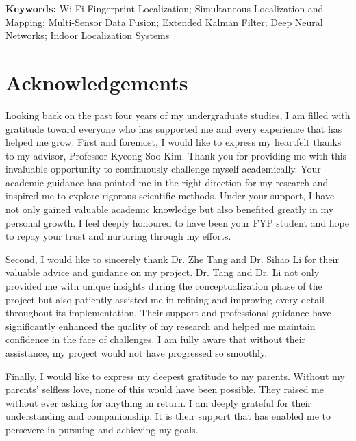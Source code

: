 \documentclass[12pt,a4paper]{article}
\numberwithin{equation}{section}
\begin{document}
\vspace{0.5cm}%
\noindent%
\textbf{Keywords:} Wi-Fi Fingerprint Localization; Simultaneous Localization and
Mapping; Multi-Sensor Data Fusion; Extended Kalman Filter; Deep Neural Networks;
Indoor Localization Systems



\newpage
\section*{Acknowledgements}
 Looking back on the past four
years of my undergraduate studies, I am filled with gratitude toward everyone
who has supported me and every experience that has helped me grow. First and
foremost, I would like to express my heartfelt thanks to my advisor, Professor
Kyeong Soo Kim. Thank you for providing me with this invaluable opportunity to
continuously challenge myself academically. Your academic guidance has pointed
me in the right direction for my research and inspired me to explore rigorous
scientific methods. Under your support, I have not only gained valuable academic
knowledge but also benefited greatly in my personal growth. I feel deeply
honoured to have been your FYP student and hope to repay your trust and
nurturing through my efforts.

Second, I would like to sincerely thank Dr. Zhe Tang and Dr. Sihao Li for their
valuable advice and guidance on my project. Dr. Tang and Dr. Li not only
provided me with unique insights during the conceptualization phase of the
project but also patiently assisted me in refining and improving every detail
throughout its implementation. Their support and professional guidance have
significantly enhanced the quality of my research and helped me maintain
confidence in the face of challenges. I am fully aware that without their
assistance, my project would not have progressed so smoothly.

Finally, I would like to express my deepest gratitude to my parents. Without my
parents' selfless love, none of this would have been possible. They raised me
without ever asking for anything in return. I am deeply grateful for their
understanding and companionship. It is their support that has enabled me to
persevere in pursuing and achieving my goals.


\newpage

\tableofcontents
\newpage

\listoftables
\newpage
\end{document}
